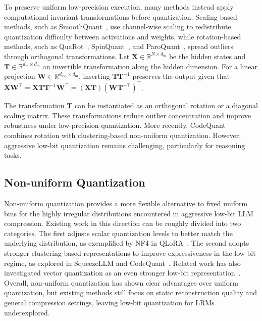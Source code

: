 \documentclass{article}
\begin{document}
To preserve uniform low-precision execution, many methods instead apply computational invariant transformations before quantization. Scaling-based methods, such as SmoothQuant~\cite{xiao2023smoothquant}, use channel-wise scaling to redistribute quantization difficulty between activations and weights, while rotation-based methods, such as QuaRot~\cite{ashkboos2024quarot}, SpinQuant~\cite{liu2024spinquant}, and ParoQuant~\cite{liang2025paroquant}, spread outliers through orthogonal transformations. Let $\mathbf{X}\in\mathbb{R}^{N\times d_{\mathrm{in}}}$ be the hidden states and $\mathbf{T}\in\mathbb{R}^{d_{\mathrm{in}}\times d_{\mathrm{in}}}$ an invertible transformation along the hidden dimension. For a linear projection $\mathbf{W}\in\mathbb{R}^{d_{\mathrm{out}}\times d_{\mathrm{in}}}$, inserting $\mathbf{T}\mathbf{T}^{-1}$ preserves the output given that $\mathbf{X}\mathbf{W}^{\top}=\mathbf{X}\mathbf{T}\mathbf{T}^{-1}\mathbf{W}^{\top}=(\mathbf{X}\mathbf{T})(\mathbf{W}\mathbf{T}^{-\top})^{\top}$.


The transformation $\mathbf{T}$ can be instantiated as an orthogonal rotation or a diagonal scaling matrix. These transformations reduce outlier concentration and improve robustness under low-precision quantization. More recently, CodeQuant~\cite{yin2026codequant} combines rotation with clustering-based non-uniform quantization. However, aggressive low-bit quantization remains challenging, particularly for reasoning tasks.

\subsection{Non-uniform Quantization}
Non-uniform quantization provides a more flexible alternative to fixed uniform bins for the highly irregular distributions encountered in aggressive low-bit LLM compression. Existing work in this direction can be roughly divided into two categories. The first adjusts scalar quantization levels to better match the underlying distribution, as exemplified by NF4 in QLoRA~\cite{dettmers2023qlora}. The second adopts stronger clustering-based representations to improve expressiveness in the low-bit regime, as explored in SqueezeLLM and CodeQuant~\cite{kim2023squeezellm,yin2026codequant}. Related work has also investigated vector quantization as an even stronger low-bit representation~\cite{liu2024vptq}. Overall, non-uniform quantization has shown clear advantages over uniform quantization, but existing methods still focus on static reconstruction quality and general compression settings, leaving low-bit quantization for LRMs underexplored.
\end{document}
